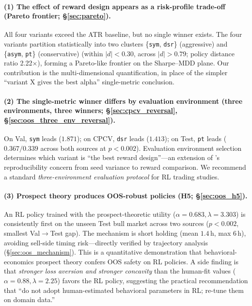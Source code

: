 \documentclass[11pt, a4paper]{article}
\begin{document}
\paragraph{(1) The effect of reward design appears as a risk-profile
trade-off (Pareto frontier; \S\ref{sec:pareto}).}
All four variants exceed the ATR baseline, but no single winner exists. The
four variants partition statistically into two clusters \{\texttt{sym},
\texttt{dsr}\} (aggressive) and \{\texttt{asym}, \texttt{pt}\} (conservative)
(within $|d|<0.30$, across $|d|>0.79$; policy distance ratio 2.22$\times$),
forming a Pareto-like frontier on the Sharpe--MDD plane. Our contribution is
the multi-dimensional quantification, in place of the simpler ``variant X
gives the best alpha'' single-metric conclusion.

\paragraph{(2) The single-metric winner differs by evaluation environment
(three environments, three winners;
\S\ref{sec:cpcv_reversal}, \S\ref{sec:oos_three_env_reversal}).}
On Val, \texttt{sym} leads ($1.871$); on CPCV, \texttt{dsr} leads ($1.413$);
on Test, \texttt{pt} leads ($0.367 / 0.339$ across both sources at $p<0.002$).
Evaluation environment selection determines which variant is ``the best
reward design''---an extension of \citet{henderson2018rlreproducibility}'s
reproducibility concern from seed variance to reward comparison. We
recommend a standard \emph{three-environment evaluation protocol} for RL
trading studies.

\paragraph{(3) Prospect theory produces OOS-robust policies (H5;
\S\ref{sec:oos_h5}).}
An RL policy trained with the \citet{kahneman1979prospect} prospect-theoretic
utility ($\alpha=0.683, \lambda=3.303$) is consistently first on the unseen
Test bull market across two sources ($p<0.002$, smallest Val$\to$Test gap).
The mechanism is short holding (mean $1.4$\,h, max $6$\,h), avoiding
sell-side timing risk---directly verified by trajectory analysis
(\S\ref{sec:oos_mechanism}). This is a quantitative demonstration that
behavioral-economics prospect theory confers OOS safety on RL policies. A side finding is that
\emph{stronger loss aversion and stronger concavity} than the human-fit
values ($\alpha=0.88, \lambda=2.25$) favors the RL policy, suggesting the
practical recommendation that ``do not adopt human-estimated behavioral
parameters in RL; re-tune them on domain data.''
\end{document}
